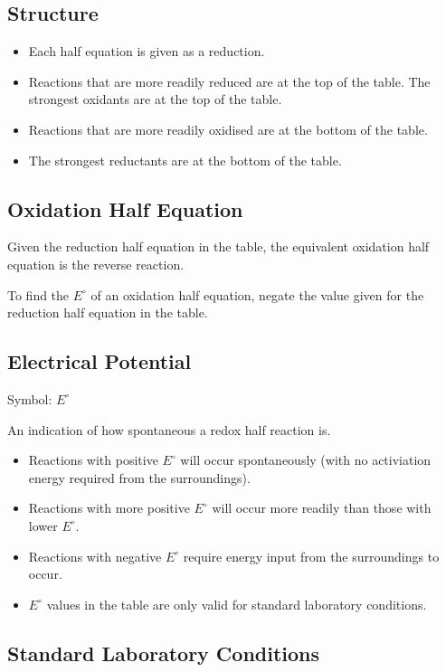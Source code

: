 \documentclass[a4paper,11pt]{article}
\begin{document}
\subsection{Structure}

\begin{itemize}
\item Each half equation is given as a reduction.
\item Reactions that are more readily reduced are at the top of the table.
\itme The strongest oxidants are at the top of the table.
\item Reactions that are more readily oxidised are at the bottom of the table.
\item The strongest reductants are at the bottom of the table.
\end{itemize}

\subsection{Oxidation Half Equation}

Given the reduction half equation in the table, the equivalent oxidation half
equation is the reverse reaction.

To find the $E^\circ$ of an oxidation half equation, negate the value given for
the reduction half equation in the table.

\subsection{Electrical Potential}

Symbol: $E^\circ$

An indication of how spontaneous a redox half reaction is.

\begin{itemize}
\item Reactions with positive $E^\circ$ will occur spontaneously (with no
	activiation energy required from the surroundings).
\item Reactions with more positive $E^\circ$ will occur more readily than those
	with lower $E^\circ$.
\item Reactions with negative $E^\circ$ require energy input from the
	surroundings to occur.
\item $E^\circ$ values in the table are only valid for standard laboratory
	conditions.
\end{itemize}

\subsection{Standard Laboratory Conditions}
\end{document}
